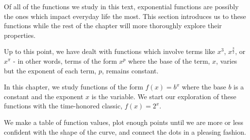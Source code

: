 

\setcounter{footnote}{0}

\label{ExponentialFunctions}

Of all of the functions we study in this text, exponential  functions are possibly the ones which impact everyday life the most. This section introduces us to these functions while the rest of the chapter will more thoroughly explore their properties. 

\smallskip

 Up to this point, we have dealt with functions which involve terms like $x^3$,  $x^{\frac{3}{2}}$, or $x^{\pi}$ -  in other words, terms of the form  $x^{p}$ where the base of the term, $x$, varies but the exponent of each term, $p$, remains constant.  
 
 \smallskip
 
 In this chapter, we study functions of the form $f(x) = b^{x}$ where the base $b$ is a constant and the exponent $x$ is the variable.  We start our exploration of these functions with the time-honored classic,  $f(x) = 2^{x}$.  
 
 \smallskip
 
 We make a table of function values, plot enough points  until we are more or less confident with the shape of the curve,  and connect the dots in a pleasing fashion.

